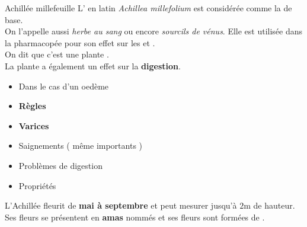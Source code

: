 \ficheidentiteplante
{Achillée millefeuille}
{%
    L' en latin \textit{Achillea millefolium} est considérée comme la  de base.\\ 
    On l'appelle aussi \textit{herbe au sang} ou encore \textit{sourcils de vénus}.
    Elle est utilisée dans la pharmacopée pour son effet sur les  et .\\
    
    On dit que c'est une plante .\\
    
    La plante a également un effet sur la \textbf{digestion}.
}
{%
    \begin{itemize}[label = \bcplume]
        \item Dans le cas d'un oedème
        \item \textbf{Règles}
        \item \textbf{Varices}
        \item Saignements ( même importants )
        \item Problèmes de digestion
        \item Propriétés 
    \end{itemize}
}
{%
    L'Achillée fleurit de \textbf{mai à septembre} et peut mesurer jusqu'à $2$m de hauteur.\\

    Ses fleurs se présentent en \textbf{amas} nommés  et ses fleurs sont formées de .
    
}
